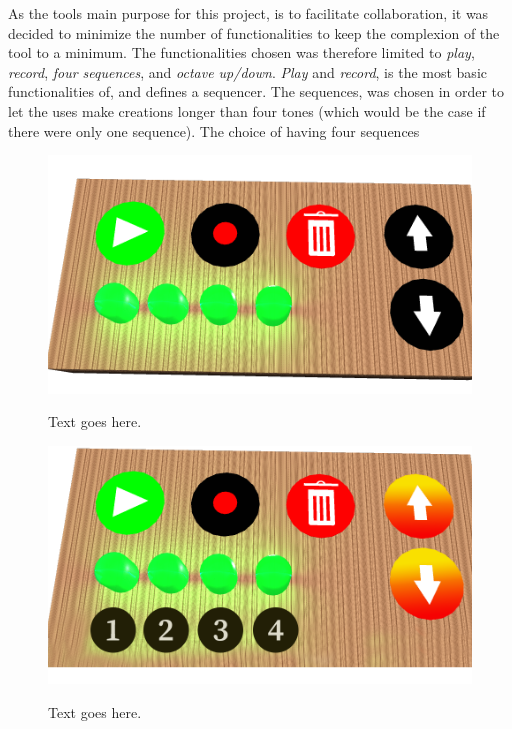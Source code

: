 As the tools main purpose for this project, is to facilitate collaboration, it was decided to minimize the number of functionalities to keep the complexion of the tool to a minimum. The functionalities chosen was therefore limited to \textit{play}, \textit{record}, \textit{four sequences}, and \textit{octave up/down}. \textit{Play} and \textit{record}, is the most basic functionalities of, and defines a sequencer. The sequences, was chosen in order to let the uses make creations longer than four tones (which would be the case if there were only one sequence). The choice of having four sequences  


\begin{figure}[H]
	\centering
	\includegraphics[width=0.7\linewidth]{figure/Design/buttonDesign}
	\label{fig:buttonDesign}
	\caption{Text goes here.}	
\end{figure}

\begin{figure}[H]
	\centering
	\includegraphics[width=0.7\linewidth]{figure/Design/buttonDesign2}
	\label{fig:buttonDesign2}
	\caption{Text goes here.}	
\end{figure}




